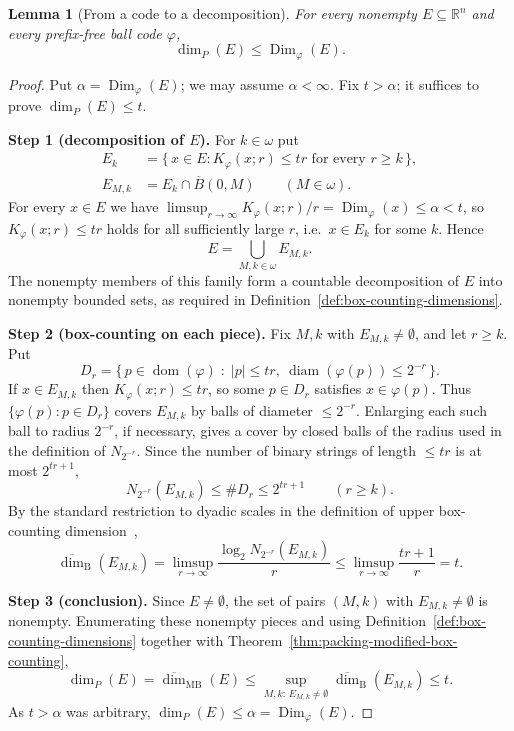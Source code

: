 \documentclass[a4paper,oneside,reqno,12pt]{amsart}
\theoremstyle{plain}
\newtheorem{lemma}[theorem]{Lemma}
\theoremstyle{definition}
\theoremstyle{remark}
\DeclareMathOperator{\Dim}{Dim}
\DeclareMathOperator{\dom}{dom}
\DeclareMathOperator{\diam}{diam}
\begin{document}
\begin{lemma}[From a code to a decomposition]
\label{lem:packing-code-to-box}
For every nonempty \(E\subseteq\mathbb R^n\) and every prefix-free ball code
\(\varphi\),
\[
\dim_P(E)\le \Dim_\varphi(E).
\]
\end{lemma}

\begin{proof}
Put \(\alpha=\Dim_\varphi(E)\); we may assume \(\alpha<\infty\).  Fix \(t>\alpha\);
it suffices to prove \(\dim_P(E)\le t\).

\smallskip
\noindent\textbf{Step 1 (decomposition of \(E\)).}
For \(k\in\omega\) put
\[
\begin{aligned}
E_k
&=
\bigl\{\,x\in E:
K_\varphi(x;r)\le tr
\text{ for every }r\ge k\,\bigr\},\\
E_{M,k}
&=
E_k\cap\overline B(0,M)
\qquad(M\in\omega).
\end{aligned}
\]
For every \(x\in E\) we have
\(\limsup_{r\to\infty}K_\varphi(x;r)/r=\Dim_\varphi(x)\le\alpha<t\), so
\(K_\varphi(x;r)\le tr\) holds for all sufficiently large \(r\), i.e.\ \(x\in E_k\)
for some \(k\).  Hence
\begin{equation}
\label{eq:packing-code-decomposition}
E=\bigcup_{M,k\in\omega}E_{M,k}.
\end{equation}
The nonempty members of this family form a countable decomposition of \(E\) into
nonempty bounded sets, as required in
Definition~\ref{def:box-counting-dimensions}.

\smallskip
\noindent\textbf{Step 2 (box-counting on each piece).}
Fix \(M,k\) with \(E_{M,k}\ne\emptyset\), and let \(r\ge k\).  Put
\[
D_r=\bigl\{\,p\in\dom(\varphi)\;:\;|p|\le tr,\ \diam(\varphi(p))\le 2^{-r}\,\bigr\}.
\]
If \(x\in E_{M,k}\) then \(K_\varphi(x;r)\le tr\), so some \(p\in D_r\) satisfies
\(x\in\varphi(p)\).  Thus \(\{\varphi(p):p\in D_r\}\) covers \(E_{M,k}\) by balls of
diameter \(\le 2^{-r}\).  Enlarging each such ball to radius \(2^{-r}\), if
necessary, gives a cover by closed balls of the radius used in the definition of
\(N_{2^{-r}}\).  Since the number of binary strings of length \(\le tr\) is at
most \(2^{tr+1}\),
\[
N_{2^{-r}}(E_{M,k})\le \# D_r\le 2^{tr+1}
\qquad(r\ge k).
\]
By the standard restriction to dyadic scales in the definition of upper
box-counting dimension~\cite[Subsection~2.1]{Falconer2014},
\[
\overline{\dim}_{\mathrm B}(E_{M,k})
=\limsup_{r\to\infty}\frac{\log_2 N_{2^{-r}}(E_{M,k})}{r}
\le\limsup_{r\to\infty}\frac{tr+1}{r}=t .
\]

\smallskip
\noindent\textbf{Step 3 (conclusion).}
Since \(E\ne\emptyset\), the set of pairs \((M,k)\) with
\(E_{M,k}\ne\emptyset\) is nonempty.  Enumerating these nonempty pieces and using
Definition~\ref{def:box-counting-dimensions} together with
Theorem~\ref{thm:packing-modified-box-counting},
\[
\dim_P(E)
=\overline{\dim}_{\mathrm{MB}}(E)
\le\sup_{M,k:\, E_{M,k}\ne\emptyset}
\overline{\dim}_{\mathrm B}(E_{M,k})
\le t .
\]
As \(t>\alpha\) was arbitrary, \(\dim_P(E)\le\alpha=\Dim_\varphi(E)\).
\end{proof}
\end{document}
